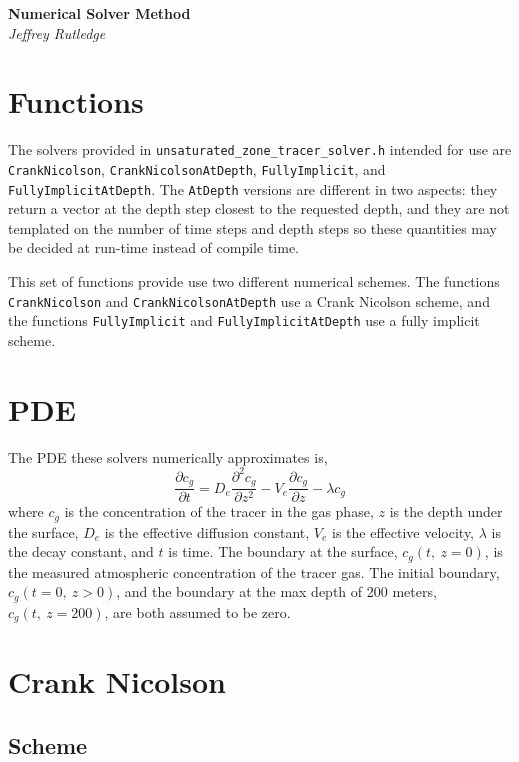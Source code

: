 \documentclass[11pt, letterpaper]{article}
\begin{document}
{\Large \bf Numerical Solver Method} \\
{\small \it Jeffrey Rutledge}

\section*{Functions}

The solvers provided in \texttt{unsaturated\_zone\_tracer\_solver.h} intended for use are \texttt{CrankNicolson}, \texttt{CrankNicolsonAtDepth}, \texttt{FullyImplicit}, and \texttt{FullyImplicitAtDepth}.
The \texttt{AtDepth} versions are different in two aspects: they return a vector at the depth step closest to the requested depth, and they are not templated on the number of time steps and depth steps so these quantities may be decided at run-time instead of compile time.

This set of functions provide use two different numerical schemes.
The functions \texttt{CrankNicolson} and \texttt{CrankNicolsonAtDepth} use a Crank Nicolson scheme, and the functions \texttt{FullyImplicit} and \texttt{FullyImplicitAtDepth} use a fully implicit scheme.

\section*{PDE}

The PDE these solvers numerically approximates is,
\[
    \frac{\partial c_g}{\partial t} = D_e \frac{\partial^2 c_g}{\partial z^2} - V_e \frac{\partial c_g}{\partial z} - \lambda c_g
\]
where $c_g$ is the concentration of the tracer in the gas phase, $z$ is the depth under the surface, $D_e$ is the effective diffusion constant, $V_e$ is the effective velocity, $\lambda$ is the decay constant, and $t$ is time.
The boundary at the surface, $c_g(t,\ z = 0)$, is the measured atmospheric concentration of the tracer gas.
The initial boundary, $c_g(t = 0,\ z > 0)$, and the boundary at the max depth of 200 meters, $c_g(t,\ z = 200)$, are both assumed to be zero.

\section*{Crank Nicolson}

\subsection*{Scheme}
\end{document}
